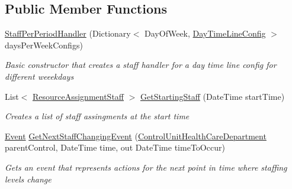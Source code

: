 \subsection*{Public Member Functions}
\begin{DoxyCompactItemize}
\item 
\hyperlink{class_general_health_care_elements_1_1_staff_handling_1_1_staff_per_period_handler_a9cffee916f15781a0beb24755190838d}{Staff\+Per\+Period\+Handler} (Dictionary$<$ Day\+Of\+Week, \hyperlink{class_general_health_care_elements_1_1_staff_handling_1_1_day_time_line_config}{Day\+Time\+Line\+Config} $>$ days\+Per\+Week\+Configs)
\begin{DoxyCompactList}\small\item\em Basic constructor that creates a staff handler for a day time line config for different weeekdays \end{DoxyCompactList}\item 
List$<$ \hyperlink{class_general_health_care_elements_1_1_resource_handling_1_1_resource_assignment_staff}{Resource\+Assignment\+Staff} $>$ \hyperlink{class_general_health_care_elements_1_1_staff_handling_1_1_staff_per_period_handler_a64f60080314c7f0e65e13ad75615c4c1}{Get\+Starting\+Staff} (Date\+Time start\+Time)
\begin{DoxyCompactList}\small\item\em Creates a list of staff assingments at the start time \end{DoxyCompactList}\item 
\hyperlink{class_simulation_core_1_1_h_c_c_m_elements_1_1_event}{Event} \hyperlink{class_general_health_care_elements_1_1_staff_handling_1_1_staff_per_period_handler_a94342109ecc8fe8c5c2b8b6430ca7e3f}{Get\+Next\+Staff\+Changing\+Event} (\hyperlink{class_general_health_care_elements_1_1_control_units_1_1_control_unit_health_care_department}{Control\+Unit\+Health\+Care\+Department} parent\+Control, Date\+Time time, out Date\+Time time\+To\+Occur)
\begin{DoxyCompactList}\small\item\em Gets an event that represents actions for the next point in time where staffing levels change \end{DoxyCompactList}\end{DoxyCompactItemize}
